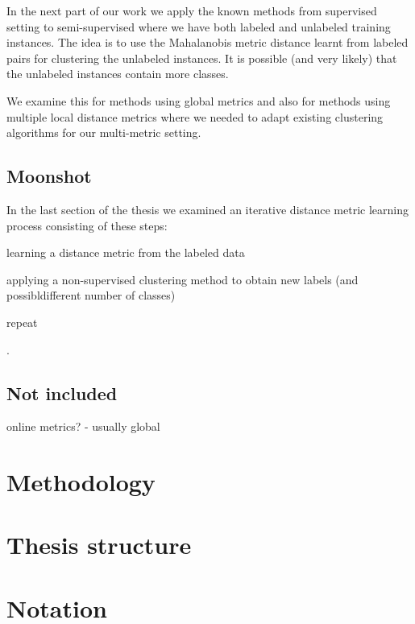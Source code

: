 \documentclass[12pt,a4paper]{report}
\begin{document}
In the next part of our work we apply the known methods from supervised setting to semi-supervised where we have both labeled and unlabeled training instances. The idea is to use the Mahalanobis metric distance learnt from labeled pairs for clustering the unlabeled instances. It is possible (and very likely) that the unlabeled instances contain more classes.

We examine this for methods using global metrics and also for methods using multiple local distance metrics where we needed to adapt existing clustering algorithms for our multi-metric setting.

\subsection{Moonshot}

In the last section of the thesis we examined an iterative distance metric learning process consisting of these steps:
\begin{enumerate*}
\item{learning a distance metric from the labeled data}
\item{applying a non-supervised clustering method to obtain new labels (and possibldifferent number of classes)}
\item{repeat}
\end{enumerate*}
.

\subsection{Not included}

online metrics? - usually global

\section{Methodology}
\section{Thesis structure}


\section{Notation} \label{notation}

\end{document}
